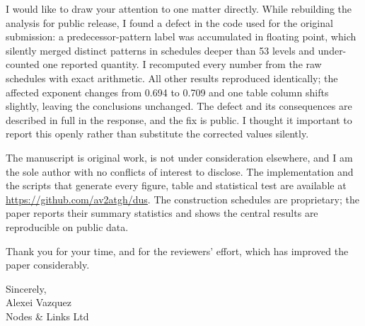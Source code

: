 \documentclass[11pt,a4paper]{article}
\begin{document}
I would like to draw your attention to one matter directly. While rebuilding the
analysis for public release, I found a defect in the code used for the original
submission: a predecessor-pattern label was accumulated in floating point, which
silently merged distinct patterns in schedules deeper than 53 levels and
under-counted one reported quantity. I recomputed every number from the raw
schedules with exact arithmetic. All other results reproduced identically; the
affected exponent changes from 0.694 to 0.709 and one table column shifts
slightly, leaving the conclusions unchanged. The defect and its consequences are
described in full in the response, and the fix is public. I thought it important
to report this openly rather than substitute the corrected values silently.

The manuscript is original work, is not under consideration elsewhere, and I am
the sole author with no conflicts of interest to disclose. The implementation and
the scripts that generate every figure, table and statistical test are available
at \url{https://github.com/av2atgh/dus}. The construction schedules are
proprietary; the paper reports their summary statistics and shows the central
results are reproducible on public data.

Thank you for your time, and for the reviewers' effort, which has improved the
paper considerably.

\vspace{-0.4em}

\vspace{0.3em}
\noindent\begin{minipage}{\linewidth}
Sincerely,\\[1.4em]
Alexei Vazquez\\
Nodes \& Links Ltd
\end{minipage}
\end{document}

